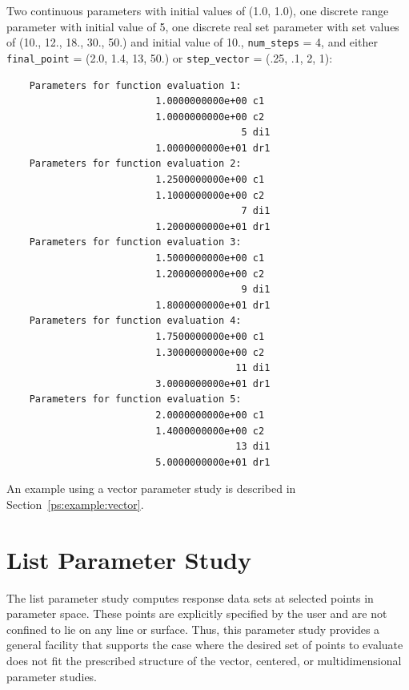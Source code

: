 Two continuous parameters with initial values of (1.0, 1.0), one
discrete range parameter with initial value of 5, one discrete real
set parameter with set values of (10., 12., 18., 30., 50.) and initial
value of 10., \texttt{num\_steps} = 4, and either \texttt{final\_point}
= (2.0, 1.4, 13, 50.) or \texttt{step\_vector} = (.25, .1, 2, 1):
\begin{small}
\begin{verbatim}
    Parameters for function evaluation 1:
                          1.0000000000e+00 c1
                          1.0000000000e+00 c2
                                         5 di1
                          1.0000000000e+01 dr1
    Parameters for function evaluation 2:
                          1.2500000000e+00 c1   
                          1.1000000000e+00 c2   
                                         7 di1
                          1.2000000000e+01 dr1
    Parameters for function evaluation 3:
                          1.5000000000e+00 c1   
                          1.2000000000e+00 c2   
                                         9 di1
                          1.8000000000e+01 dr1
    Parameters for function evaluation 4:
                          1.7500000000e+00 c1   
                          1.3000000000e+00 c2   
                                        11 di1
                          3.0000000000e+01 dr1
    Parameters for function evaluation 5:
                          2.0000000000e+00 c1   
                          1.4000000000e+00 c2   
                                        13 di1
                          5.0000000000e+01 dr1
\end{verbatim}
\end{small}

An example using a vector parameter study is described in 
Section~\ref{ps:example:vector}.

\section{List Parameter Study}\label{ps:list}

The list parameter study computes response data sets at selected
points in parameter space. These points are explicitly specified by
the user and are not confined to lie on any line or surface. Thus,
this parameter study provides a general facility that supports the
case where the desired set of points to evaluate does not fit the
prescribed structure of the vector, centered, or multidimensional
parameter studies.

